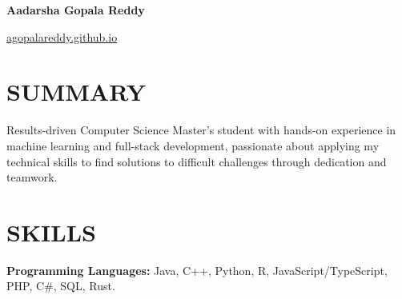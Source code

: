 \documentclass[10pt, letterpaper]{article}
\begin{document}
\begin{header}
    \begin{minipage}[t]{0.65\textwidth}
        \fontsize{20pt}{20pt}\selectfont \textbf{Aadarsha Gopala Reddy}\\
        \normalsize
        \mbox{}%
        \kern {}%
        \AND%
        \kern {}%
        \mbox{}%
    \end{minipage}
    \hfill
    \begin{minipage}[t]{0.15\textwidth}
        \raggedleft
        \href{https://agopalareddy.github.io}{agopalareddy.github.io}
    \end{minipage}
    \hfill
    \begin{minipage}[t]{0.11\textwidth}
        \raggedleft
    \end{minipage}
\end{header}

\vspace{\headerSpacing}
\section{SUMMARY}

\vspace{\entrySpacing}
\begin{onecolentry}
    Results-driven Computer Science Master's student with hands-on experience in machine learning and full-stack development, passionate about applying my technical skills to find solutions to difficult challenges through dedication and teamwork.
\end{onecolentry}

\vspace{\headerSpacing}
\section{SKILLS}

\vspace{\entrySpacing}
\begin{onecolentry}
    \textbf{Programming Languages:} Java, C++, Python, R, JavaScript/TypeScript, PHP, C\#, SQL, Rust.
\end{onecolentry}
\end{document}
